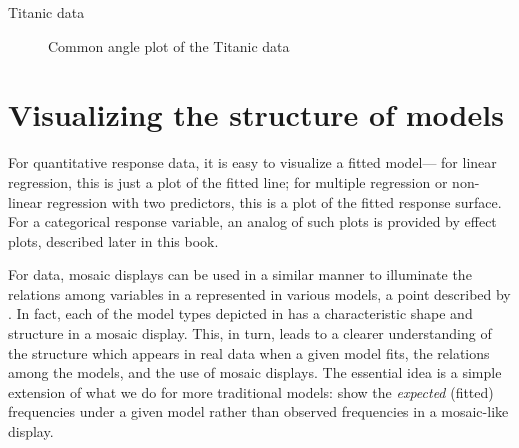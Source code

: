 \documentclass[11pt]{book}
\renewenvironment{knitrout}{\small\renewcommand{\baselinestretch}{.85}}{} %
\begin{document}
\begin{Example}{Titanic data}
\begin{knitrout}
\begin{figure}[!htbp]
\caption[Common angle plot of the Titanic data]{Common angle plot of the Titanic data\label{fig:titanic-par3}}
\end{figure}


\end{knitrout}


\end{Example}


\section{Visualizing the structure of \loglin models}\label{sec:mosaic-struc}
For quantitative response data, it is easy to visualize a fitted model---
for linear regression, this is just a plot of the fitted line;
for multiple regression or non-linear regression with two predictors,
this is a plot of the fitted response surface.  For a categorical
response variable, an analog of such plots is provided by
effect plots, described later in this book.

For \ctab data,
mosaic displays can be used in a similar manner to illuminate the relations among
variables in a \ctab represented in various \loglin{} models,
a point described by \citet{TheusLauer:99}.
In fact,
each of the model types depicted in  has
a characteristic shape and structure in a mosaic display. This,
in turn, leads to a clearer understanding of the structure which appears
in real data when a given model fits, the relations among the models,
and the use of mosaic displays.  The essential idea is a simple
extension of what we do for more traditional models:
show the \emph{expected} (fitted) frequencies under a given model
rather than observed frequencies in a mosaic-like display.
\end{document}
